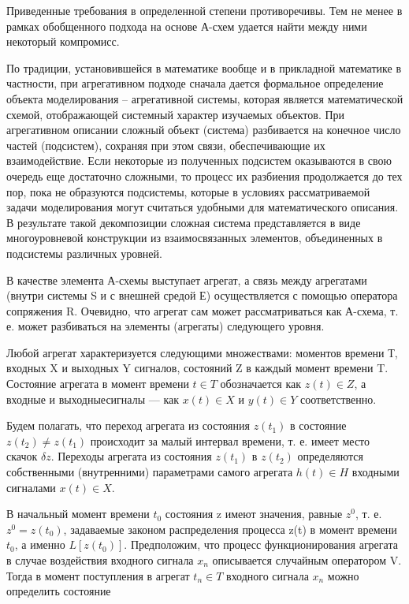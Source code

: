   Приведенные требования в определенной степени противоречивы. Тем не менее в рамках обобщенного подхода на основе А-схем удается найти между ними некоторый компромисс.

  По традиции, установившейся в математике вообще и в прикладной математике в частности, при агрегативном подходе сначала дается формальное определение объекта моделирования -- агрегативной системы, которая является математической схемой, отображающей системный характер изучаемых объектов. При агрегативном описании сложный объект (система) разбивается на конечное число частей (подсистем), сохраняя при этом связи, обеспечивающие их взаимодействие. Если некоторые из полученных подсистем оказываются в свою очередь еще достаточно сложными, то процесс их разбиения продолжается до тех пор, пока не образуются подсистемы, которые в условиях рассматриваемой задачи моделирования могут считаться удобными для математического описания. В результате такой декомпозиции сложная система представляется в виде многоуровневой конструкции из взаимосвязанных элементов, объединенных в подсистемы различных уровней.

  В качестве элемента А-схемы выступает агрегат, а связь между агрегатами (внутри системы S и с внешней средой Е) осуществляется с помощью оператора сопряжения R. Очевидно, что агрегат сам может рассматриваться как А-схема, т. е. может разбиваться на элементы (агрегаты) следующего уровня.

  Любой агрегат характеризуется следующими множествами: моментов времени Т, входных X и выходных Y сигналов, состояний Z в каждый момент времени T. Состояние агрегата в момент времени $t \in T$ обозначается как $z(t) \in Z$, а входные и выходныесигналы — как $x(t) \in X$ и $y(t) \in Y$ соответственно.

  Будем полагать, что переход агрегата из состояния $z(t_{1})$ в состояние $z(t_{2}) \ne z(t_{1})$ происходит за малый интервал времени, т. е. имеет место скачок $\delta z$. Переходы агрегата из состояния $z(t_{1})$ в $z(t_{2})$ определяются собственными (внутренними) параметрами самого агрегата $h(t) \in H$ входными сигналами $x(t) \in X$.

  В начальный момент времени $t_{0}$ состояния z имеют значения, равные $z^{0}$, т. е. $z^{0} = z(t_{0})$, задаваемые законом распределения процесса z(t) в момент времени $t_{0}$, а именно $L[z(t_{0})]$. Предположим, что процесс функционирования агрегата в случае воздействия входного сигнала $x_{n}$ описывается случайным оператором V. Тогда в момент поступления в агрегат $t_{n} \in T$ входного сигнала $x_{n}$ можно определить состояние

